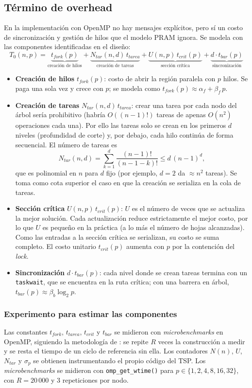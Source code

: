 \documentclass[12pt,a4paper]{article}
\begin{document}
\subsection{Término de overhead}
\label{sec:overhead}

En la implementación con OpenMP no hay mensajes explícitos, pero sí un costo de sincronización y gestión de hilos que el modelo PRAM ignora. Se modela con las componentes identificadas en el diseño:
\[
T_0(n,p) = \underbrace{t_{fork}(p)}_{\text{creación de hilos}}
+ \underbrace{N_{tar}(n,d)\, t_{tarea}}_{\text{creación de tareas}}
+ \underbrace{U(n,p)\, t_{crit}(p)}_{\text{sección crítica}}
+ \underbrace{d \cdot t_{bar}(p)}_{\text{sincronización}}
\]
\begin{itemize}
    \item \textbf{Creación de hilos} $t_{fork}(p)$: costo de abrir la región paralela con $p$ hilos. Se paga una sola vez y crece con $p$; se modela como $t_{fork}(p) \approx \alpha_f + \beta_f \, p$.
    \item \textbf{Creación de tareas} $N_{tar}(n,d)\,t_{tarea}$: crear una tarea por cada nodo del árbol sería prohibitivo (habría $O((n-1)!)$ tareas de apenas $O(n^2)$ operaciones cada una). Por ello las tareas solo se crean en los primeros $d$ niveles (profundidad de corte) y, por debajo, cada hilo continúa de forma secuencial. El número de tareas es
    \[
    N_{tar}(n,d) = \sum_{k=1}^{d} \frac{(n-1)!}{(n-1-k)!} \le d\,(n-1)^d,
    \]
    que es polinomial en $n$ para $d$ fijo (por ejemplo, $d=2$ da $\approx n^2$ tareas). Se toma como cota superior el caso en que la creación se serializa en la cola de tareas.
    \item \textbf{Sección crítica} $U(n,p)\,t_{crit}(p)$: $U$ es el número de veces que se actualiza la mejor solución. Cada actualización reduce estrictamente el mejor costo, por lo que $U$ es pequeño en la práctica (a lo más el número de hojas alcanzadas). Como las entradas a la sección crítica se serializan, su costo se suma completo. El costo unitario $t_{crit}(p)$ aumenta con $p$ por la contención del \textit{lock}.
    \item \textbf{Sincronización} $d \cdot t_{bar}(p)$: cada nivel donde se crean tareas termina con un \texttt{taskwait}, que se encuentra en la ruta crítica; con una barrera en árbol, $t_{bar}(p) \approx \beta_b \log_2 p$.
\end{itemize}

\subsubsection*{Experimento para estimar las componentes}
Las constantes $t_{fork}$, $t_{tarea}$, $t_{crit}$ y $t_{bar}$ se midieron con \textit{microbenchmarks} en OpenMP, siguiendo la metodología de \citet{bull1999measuring}: se repite $R$ veces la construcción a medir y se resta el tiempo de un ciclo de referencia sin ella. Los contadores $N(n)$, $U$, $N_{tar}$ y $\sigma_p$ se obtienen instrumentando el propio código del TSP. Los \textit{microbenchmarks} se midieron con \texttt{omp\_get\_wtime()} para $p \in \{1, 2, 4, 8, 16, 32\}$, con $R = 20\,000$ y 3 repeticiones por nodo.
\end{document}

